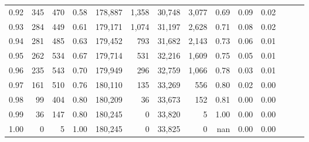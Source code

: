 \begin{tabular}{rrrrrrrrrrrrrr}
0.92 &    345 &  470 &  0.58 &  178,887 &    1,358 &  30,748 &   3,077 &  0.69 &  0.09 &      0.02 \\
0.93 &    284 &  449 &  0.61 &  179,171 &    1,074 &  31,197 &   2,628 &  0.71 &  0.08 &      0.02 \\
0.94 &    281 &  485 &  0.63 &  179,452 &      793 &  31,682 &   2,143 &  0.73 &  0.06 &      0.01 \\
0.95 &    262 &  534 &  0.67 &  179,714 &      531 &  32,216 &   1,609 &  0.75 &  0.05 &      0.01 \\
0.96 &    235 &  543 &  0.70 &  179,949 &      296 &  32,759 &   1,066 &  0.78 &  0.03 &      0.01 \\
0.97 &    161 &  510 &  0.76 &  180,110 &      135 &  33,269 &     556 &  0.80 &  0.02 &      0.00 \\
0.98 &     99 &  404 &  0.80 &  180,209 &       36 &  33,673 &     152 &  0.81 &  0.00 &      0.00 \\
0.99 &     36 &  147 &  0.80 &  180,245 &        0 &  33,820 &       5 &  1.00 &  0.00 &      0.00 \\
1.00 &      0 &    5 &  1.00 &  180,245 &        0 &  33,825 &       0 &   nan &  0.00 &      0.00 \\
\bottomrule
\end{tabular}
